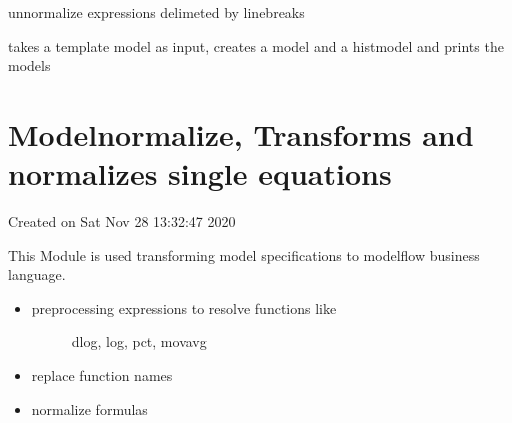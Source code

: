 \documentclass[letterpaper,10pt,english]{sphinxmanual}
\begin{document}

\begin{fulllineitems}
\label{\detokenize{index:modelmanipulation.un_normalize_simpel}}
\pysigstartsignatures
{}
\pysigstopsignatures
\sphinxAtStartPar
un\sphinxhyphen{}normalize expressions delimeted by linebreaks

\end{fulllineitems}


\begin{fulllineitems}
\label{\detokenize{index:modelmanipulation.eksempel}}
\pysigstartsignatures
{}
\pysigstopsignatures
\sphinxAtStartPar
takes a template model as input, creates a model and a histmodel and prints the models

\end{fulllineitems}



\section{Modelnormalize, Transforms and normalizes single equations}
\label{\detokenize{index:module-modelnormalize}}\label{\detokenize{index:modelnormalize-transforms-and-normalizes-single-equations}}
\sphinxAtStartPar
Created on Sat Nov 28 13:32:47 2020

\sphinxAtStartPar
This Module is used transforming model specifications to modelflow business language.
\begin{itemize}
\item {} \begin{description}
\item[{preprocessing expressions to resolve functions like}] \leavevmode
\sphinxAtStartPar
dlog, log, pct, movavg

\end{description}

\item {} 
\sphinxAtStartPar
replace function names

\item {} 
\sphinxAtStartPar
normalize formulas

\end{itemize}
\end{document}
